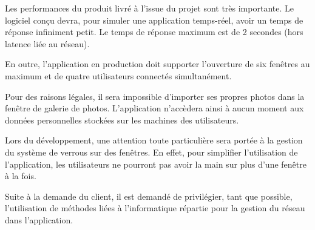 Les performances du produit livré à l'issue du projet sont très 
importante. Le logiciel conçu devra, pour simuler une application
temps-réel, avoir un temps de réponse infiniment petit. Le temps
de réponse maximum est de 2 secondes (hors latence liée au réseau).

En outre, l'application en production doit supporter l'ouverture de 
six fenêtres au maximum et de quatre utilisateurs connectés simultanément.

Pour des raisons légales, il sera impossible d'importer ses propres
photos dans la fenêtre de galerie de photos. L'application n'accèdera
ainsi à aucun moment aux données personnelles stockées sur les machines
des utilisateurs.

Lors du développement, une attention toute particulière sera portée
à la gestion du système de verrous sur des fenêtres. En effet, pour 
simplifier l'utilisation de l'application, les utilisateurs ne 
pourront pas avoir la main sur plus d'une fenêtre à la fois.

Suite à la demande du client, il est demandé de privilégier, tant que
possible, l'utilisation de méthodes liées à l'informatique répartie pour
la gestion du réseau dans l'application.

